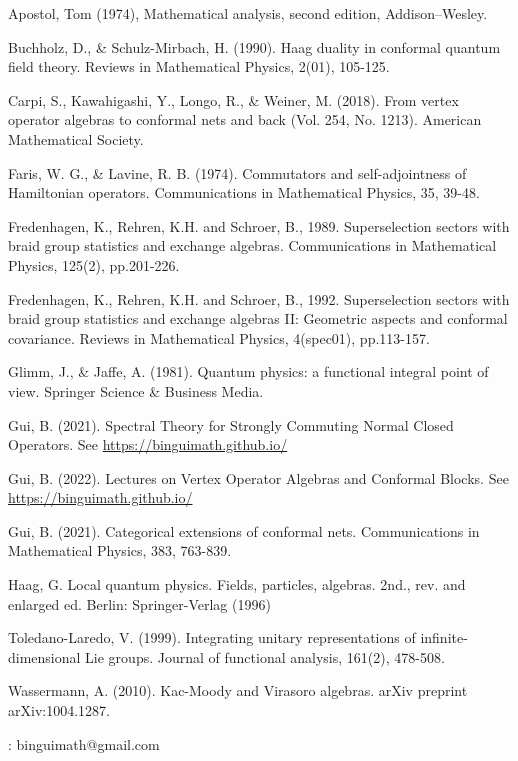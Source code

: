 \documentclass[12pt,b5paper,notitlepage]{article}
\theoremstyle{definition}
\theoremstyle{plain}
\numberwithin{equation}{section}
\begin{document}
\printindex


\begin{thebibliography}{999999}
\footnotesize	

Apostol, Tom (1974), Mathematical analysis, second edition, Addison–Wesley.


Buchholz, D., \& Schulz-Mirbach, H. (1990). Haag duality in conformal quantum field theory. Reviews in Mathematical Physics, 2(01), 105-125.


Carpi, S., Kawahigashi, Y., Longo, R., \& Weiner, M. (2018). From vertex operator algebras to conformal nets and back (Vol. 254, No. 1213). American Mathematical Society.


Faris, W. G., \& Lavine, R. B. (1974). Commutators and self-adjointness of Hamiltonian operators. Communications in Mathematical Physics, 35, 39-48.

Fredenhagen, K., Rehren, K.H. and Schroer, B., 1989. Superselection sectors with braid group statistics and exchange algebras. Communications in Mathematical Physics, 125(2), pp.201-226.


Fredenhagen, K., Rehren, K.H. and Schroer, B., 1992. Superselection sectors with braid group statistics and exchange algebras II: Geometric aspects and conformal covariance. Reviews in Mathematical Physics, 4(spec01), pp.113-157.


Glimm, J., \& Jaffe, A. (1981). Quantum physics: a functional integral point of view. Springer Science \& Business Media.


Gui, B. (2021). Spectral Theory for Strongly Commuting Normal Closed Operators. See \href{https://binguimath.github.io/}{https://binguimath.github.io/}

Gui, B. (2022). Lectures on Vertex Operator Algebras and Conformal Blocks. See \href{https://binguimath.github.io/}{https://binguimath.github.io/}

Gui, B. (2021). Categorical extensions of conformal nets. Communications in Mathematical Physics, 383, 763-839.


Haag, G. Local quantum physics. Fields, particles, algebras. 2nd., rev. and enlarged ed. Berlin: Springer-Verlag (1996)

Toledano-Laredo, V. (1999). Integrating unitary representations of infinite-dimensional Lie groups. Journal of functional analysis, 161(2), 478-508.

Wassermann, A. (2010). Kac-Moody and Virasoro algebras. arXiv preprint arXiv:1004.1287.







\end{thebibliography}

: binguimath@gmail.com
\end{document}
